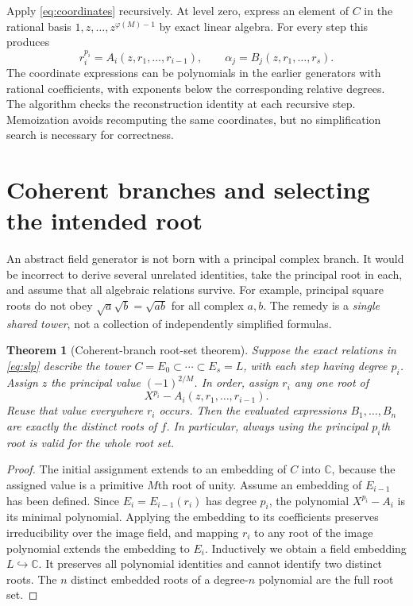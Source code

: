 \documentclass[11pt,a4paper]{article}
\newtheorem{theorem}{Theorem}[section]
\theoremstyle{definition}
\theoremstyle{remark}
\newcommand{\C}{\mathbb C}
\begin{document}
Apply \eqref{eq:coordinates} recursively. At level zero, express an element of
$C$ in the rational basis $1,z,\ldots,z^{\varphi(M)-1}$ by exact linear algebra.
For every step this produces
\begin{equation}\label{eq:slp}
 r_i^{p_i}=A_i(z,r_1,\ldots,r_{i-1}),
 \qquad
 \alpha_j=B_j(z,r_1,\ldots,r_s).
\end{equation}
The coordinate expressions can be polynomials in the earlier generators with
rational coefficients, with exponents below the corresponding relative
degrees. The algorithm checks the reconstruction identity at each recursive
step. Memoization avoids recomputing the same coordinates, but no
simplification search is necessary for correctness.

\section{Coherent branches and selecting the intended root}
\label{sec:branches}
An abstract field generator is not born with a principal complex branch. It
would be incorrect to derive several unrelated identities, take the principal
root in each, and assume that all algebraic relations survive. For example,
principal square roots do not obey $\sqrt a\sqrt b=\sqrt{ab}$ for all complex
$a,b$. The remedy is a \emph{single shared tower}, not a collection of
independently simplified formulas.

\begin{theorem}[Coherent-branch root-set theorem]\label{thm:branches}
Suppose the exact relations in \eqref{eq:slp} describe the tower
$C=E_0\subset\cdots\subset E_s=L$, with each step having degree $p_i$.
Assign $z$ the principal value $(-1)^{2/M}$. In order, assign $r_i$ any one root
of
\[
 X^{p_i}-A_i(z,r_1,\ldots,r_{i-1}).
\]
Reuse that value everywhere $r_i$ occurs. Then the evaluated expressions
$B_1,\ldots,B_n$ are exactly the distinct roots of $f$. In particular, always
using the principal $p_i$th root is valid for the \emph{whole root set}.
\end{theorem}
\begin{proof}
The initial assignment extends to an embedding of $C$ into $\C$, because the
assigned value is a primitive $M$th root of unity. Assume an embedding of
$E_{i-1}$ has been defined. Since $E_i=E_{i-1}(r_i)$ has degree $p_i$, the
polynomial $X^{p_i}-A_i$ is its minimal polynomial. Applying the embedding to
its coefficients preserves irreducibility over the image field, and mapping
$r_i$ to any root of the image polynomial extends the embedding to $E_i$.
Inductively we obtain a field embedding $L\hookrightarrow\C$. It preserves all
polynomial identities and cannot identify two distinct roots. The $n$
distinct embedded roots of a degree-$n$ polynomial are the full root set.
\end{proof}
\end{document}
